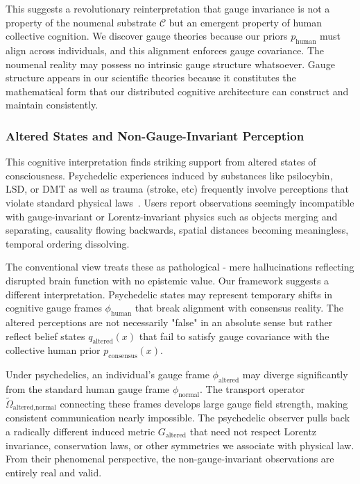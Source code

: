 \documentclass[11pt]{article}
\begin{document}
This suggests a revolutionary reinterpretation that gauge invariance is not a property of the noumenal substrate $\mathcal{C}$ but an emergent property of human collective cognition. We discover gauge theories because our priors $p_{\text{human}}$ must align across individuals, and this alignment enforces gauge covariance. The noumenal reality may possess no intrinsic gauge structure whatsoever. Gauge structure appears in our scientific theories because it constitutes the mathematical form that our distributed cognitive architecture can construct and maintain consistently.

\subsubsection{Altered States and Non-Gauge-Invariant Perception}

This cognitive interpretation finds striking support from altered states of consciousness. Psychedelic experiences induced by substances like psilocybin, LSD, or DMT as well as trauma (stroke, etc) frequently involve perceptions that violate standard physical laws~\cite{Carhart-Harris2014,Swanson2018}. Users report observations seemingly incompatible with gauge-invariant or Lorentz-invariant physics such as objects merging and separating, causality flowing backwards, spatial distances becoming meaningless, temporal ordering dissolving.

The conventional view treats these as pathological - mere hallucinations reflecting disrupted brain function with no epistemic value. Our framework suggests a different interpretation. Psychedelic states may represent temporary shifts in cognitive gauge frames $\phi_{\text{human}}$ that break alignment with consensus reality. The altered perceptions are not necessarily "false" in an absolute sense but rather reflect belief states $q_{\text{altered}}(x)$ that fail to satisfy gauge covariance with the collective human prior $p_{\text{consensus}}(x)$.

Under psychedelics, an individual's gauge frame $\phi_{\text{altered}}$ may diverge significantly from the standard human gauge frame $\phi_{\text{normal}}$. The transport operator $\tilde{\Omega}_{\text{altered,normal}}$ connecting these frames develops large gauge field strength, making consistent communication nearly impossible. The psychedelic observer pulls back a radically different induced metric $G_{\text{altered}}$ that need not respect Lorentz invariance, conservation laws, or other symmetries we associate with physical law. From their phenomenal perspective, the non-gauge-invariant observations are entirely real and valid.
\end{document}
